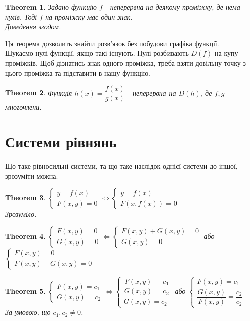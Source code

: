 \documentclass[a4paper, 10pt]{article}
\theoremstyle{theoremdd}
\newtheorem{theorem}{Theorem}[subsection]
\theoremstyle{theoremdd}
\theoremstyle{theoremdd}
\theoremstyle{theoremdd}
\theoremstyle{theoremdd}
\theoremstyle{theoremdd}
\theoremstyle{theoremdd}
\theoremstyle{theoremdd}
\begin{document}
\begin{theorem}
Задано функцію $f$ - неперервна на деякому проміжку, де нема нулів. Тоді $f$ на проміжку має один знак.\\
\textit{Доведення згодом.}
\end{theorem}
Ця теорема дозволить знайти розв'язок без побудови графіка функції.\\
Шукаємо нулі функції, якщо такі існують. Нулі розбивають $D(f)$ на купу проміжків. Щоб дізнатись знак одного проміжка, треба взяти довільну точку з цього проміжка та підставити в нашу функцію.

\begin{theorem}
Функція $h(x) = \dfrac{f(x)}{g(x)}$ - неперервна на $D(h)$, де $f,g$ - многочлени.
\end{theorem}
\newpage

\section{Системи рівнянь}
Що таке рівносильні системи, та що таке наслідок однієї системи до іншої, зрозуміти можна.

\begin{theorem}
$\begin{cases}
y = f(x) \\
F(x,y) = 0
\end{cases} \iff 
\begin{cases}
y = f(x) \\
F(x,f(x)) = 0
\end{cases}$\\
\textit{Зрозуміло.}
\end{theorem}

\begin{theorem}
$\begin{cases}
F(x,y) = 0 \\
G(x,y) = 0
\end{cases} \iff \begin{cases} F(x,y)+G(x,y) = 0 \\ G(x,y) = 0 \end{cases}$ або $\begin{cases} F(x,y) = 0 \\ F(x,y)+G(x,y) = 0 \end{cases}$
\end{theorem}

\begin{theorem}
$\begin{cases}
F(x,y) = c_1 \\
G(x,y) = c_2
\end{cases} \iff \begin{cases} \dfrac{F(x,y)}{G(x,y)} = \dfrac{c_1}{c_2} \\ G(x,y) = c_2 \end{cases}$ або $\begin{cases} F(x,y) = c_1 \\ \dfrac{G(x,y)}{F(x,y)} = \dfrac{c_2}{c_2} \end{cases}$\\
За умовою, що $c_1,c_2 \neq 0$.
\end{theorem}
\end{document}

